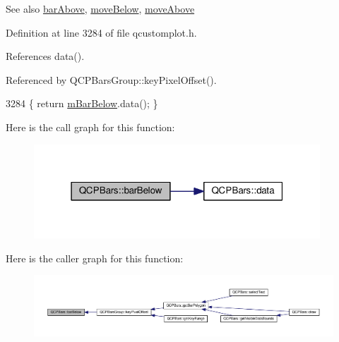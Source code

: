 \begin{DoxySeeAlso}{See also}
\hyperlink{class_q_c_p_bars_a9ca48a6577586825d85bdc1fbf410803}{bar\+Above}, \hyperlink{class_q_c_p_bars_a69fc371346980f19177c3d1ecdad78ee}{move\+Below}, \hyperlink{class_q_c_p_bars_ac22e00a6a41509538c21b04f0a57318c}{move\+Above} 
\end{DoxySeeAlso}


Definition at line 3284 of file qcustomplot.\+h.



References data().



Referenced by Q\+C\+P\+Bars\+Group\+::key\+Pixel\+Offset().


\begin{DoxyCode}
3284 \{ \textcolor{keywordflow}{return} \hyperlink{class_q_c_p_bars_ad51db970eed7e286f2753b0216fc56de}{mBarBelow}.data(); \}
\end{DoxyCode}


Here is the call graph for this function\+:\nopagebreak
\begin{figure}[H]
\begin{center}
\leavevmode
\includegraphics[width=304pt]{class_q_c_p_bars_a2c46a686cbad95f180ca3c2e88263961_cgraph}
\end{center}
\end{figure}




Here is the caller graph for this function\+:\nopagebreak
\begin{figure}[H]
\begin{center}
\leavevmode
\includegraphics[width=350pt]{class_q_c_p_bars_a2c46a686cbad95f180ca3c2e88263961_icgraph}
\end{center}
\end{figure}


\hypertarget{class_q_c_p_bars_a6d6b2b17619a0ba9c7a88bb2b90fc178}{}
